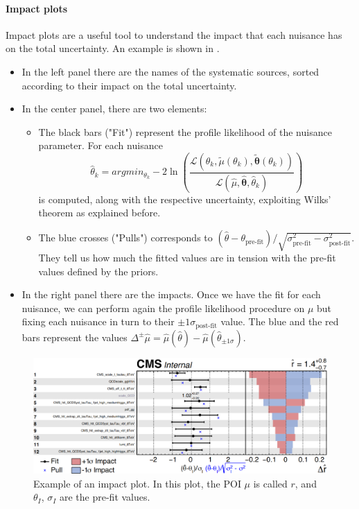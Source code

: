 \paragraph*{Impact plots} Impact plots are a useful tool to understand the impact that each nuisance has on the total uncertainty. An example is shown in .\\
\begin{itemize}
    \item In the left panel there are the names of the systematic sources, sorted according to their impact on the total uncertainty.

    \item In the center panel, there are two elements:
    \begin{itemize}
        \item[\ding{226}] The black bars ("Fit") represent the profile likelihood of the nuisance parameter. For each nuisance
        \begin{equation}
             \hat{\theta}_k=argmin_{\theta_k} -2 \ln \left( \frac{\mathcal{L}(\theta_k, \tilde{\mu}(\theta_k),\bm{\tilde{\theta}}(\theta_k))}{\mathcal{L}(\hat{\mu},\bm{\hat{\theta}},\hat{\theta}_k)} \right)
        \end{equation}
        is computed, along with the respective uncertainty, exploiting Wilks' theorem as explained before.
        \item[\ding{226}] The blue crosses ("Pulls") corresponds to $(\hat{\theta}-\theta_{\text{pre-fit}})/\sqrt{\sigma_{\text{pre-fit}}^2-\sigma_{\text{post-fit}}^2}$.\\
        They tell us how much the fitted values are in tension with the pre-fit values defined by the priors.      
    \end{itemize}
    \item In the right panel there are the impacts.
    Once we have the fit for each nuisance, we can perform again the profile likelihood procedure on $\mu$ but fixing each nuisance in turn to their $\pm 1 \sigma_{\text{post-fit}}$ value. The blue and the red bars represent the values $\Delta^{\pm} \hat{\mu}=\hat{\mu}(\hat{\theta})-\hat{\mu}(\hat{\theta}_{\pm 1 \sigma})$.    
\end{itemize}
\begin{figure}[H]
    \centering
    \includegraphics[width=1\linewidth]{fig/chap05-stats/impact.png}
    \caption{Example of an impact plot. In this plot, the POI $\mu$ is called $r$, and $\theta_I$, $\sigma_I$ are the pre-fit values.}
    \label{fig:impact}
\end{figure}


